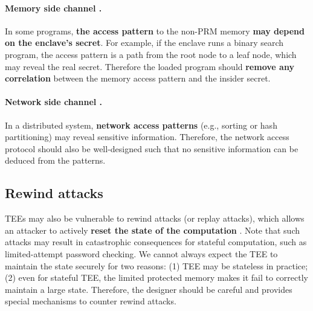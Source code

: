 \documentclass[lang=en]{sjtuarticle}
\begin{document}
\paragraph{Memory side channel \cite{sasy2017zerotrace}.} In some programs, \textbf{the access pattern} to the non-PRM memory
\textbf{may depend on the enclave's secret}. For example, if the enclave runs a binary search program,
the access pattern is a path from the root node to a leaf node, which may reveal the real
secret. Therefore the loaded program should \textbf{remove any correlation} between the memory
access pattern and the insider secret.

\paragraph{Network side channel \cite{zheng2017opaque}.} In a distributed system, \textbf{network access patterns} (e.g., sorting or
hash partitioning) may reveal sensitive information. Therefore, the network access protocol
should also be well-designed such that no sensitive information can be deduced from the
patterns.

\subsection{Rewind attacks}

TEEs may also be vulnerable to rewind attacks (or replay attacks), which allows an
attacker to actively \textbf{reset the state of the computation} \cite{bellare2001identification}. Note that such attacks may result in
catastrophic consequences for stateful computation, such as limited-attempt password checking. We cannot always expect the TEE to maintain the state securely for two reasons: (1) TEE
may be stateless in practice; (2) even for stateful TEE, the limited protected memory makes it fail
to correctly maintain a large state. Therefore, the designer should be careful and provides special
mechanisms to counter rewind attacks.

\printbibliography
\end{document}
